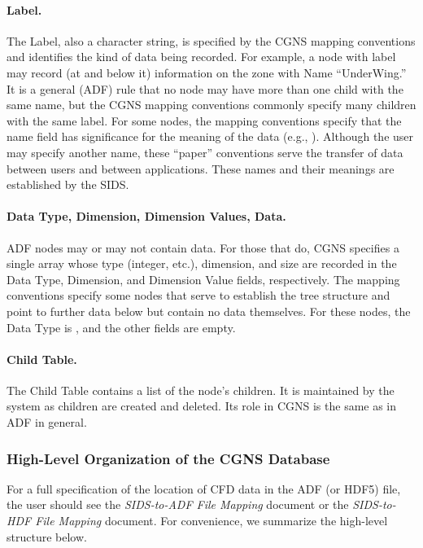 \paragraph{Label.}
The Label, also a character string, is specified by the CGNS mapping
conventions and identifies the kind of data being recorded.
For example, a node with label  may record (at and below
it) information on the zone with Name ``UnderWing.''
It is a general (ADF) rule that no node may have more than one child
with the same name, but the CGNS mapping conventions commonly specify
many children with the same label.
For some nodes, the mapping conventions specify that the name
field has significance for the meaning of the data (e.g.,
).
Although the user may specify another name, these ``paper'' conventions
serve the transfer of data between users and between applications.
These names and their meanings are established by the SIDS.

\paragraph{Data Type, Dimension, Dimension Values, Data.}
ADF nodes may or may not contain data.
For those that do, CGNS specifies a single array whose type (integer,
etc.), dimension, and size are recorded in the Data Type, Dimension, and
Dimension Value fields, respectively.
The mapping conventions specify some nodes that serve to establish the
tree structure and point to further data below but contain no data
themselves.
For these nodes, the Data Type is , and the other fields are
empty.

\paragraph{Child Table.}
The Child Table contains a list of the node's children.
It is maintained by the system as children are created and deleted.
Its role in CGNS is the same as in ADF in general.

\subsubsection{High-Level Organization of the CGNS Database}

For a full specification of the location of CFD data in the ADF (or
HDF5) file, the user should see the \textit{SIDS-to-ADF File Mapping}
document or the \textit{SIDS-to-HDF File Mapping} document.
For convenience, we summarize the high-level structure below.


